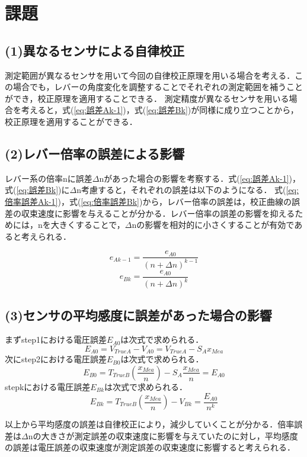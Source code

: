 \section{課題}

\subsection{(1)異なるセンサによる自律校正}
測定範囲が異なるセンサを用いて今回の自律校正原理を用いる場合を考える．この場合でも，レバーの角度変化を調整することでそれぞれの測定範囲を補うことができ，校正原理を適用することできる．
測定精度が異なるセンサを用いる場合を考えると，式(\ref{eq:誤差Ak-1})，式(\ref{eq:誤差Bk})が同様に成り立つことから，校正原理を適用することができる．

\subsection{(2)レバー倍率の誤差による影響}
レバー系の倍率nに誤差$\Delta$nがあった場合の影響を考察する．式(\ref{eq:誤差Ak-1})，式(\ref{eq:誤差Bk})に$\Delta$n考慮すると，それぞれの誤差は以下のようになる．
式(\ref{eq:倍率誤差Ak-1})，式(\ref{eq:倍率誤差Bk})から，レバー倍率の誤差は，校正曲線の誤差の収束速度に影響を与えることが分かる．レバー倍率の誤差の影響を抑えるためには，nを大きくすることで，$\Delta$nの影響を相対的に小さくすることが有効であると考えられる．

\begin{equation}
    e_{Ak-1} = \frac{e_{A0}}{(n + \Delta n)^{k-1}}
    \label{eq:倍率誤差Ak-1}
\end{equation}
\begin{equation}
    e_{Bk} = \frac{e_{A0}}{(n + \Delta n)^{k}}
    \label{eq:倍率誤差Bk}
\end{equation}

\subsection{(3)センサの平均感度に誤差があった場合の影響}
まずstep1における電圧誤差$E_{A0}$は次式で求められる．
\begin{equation}
    E_{A0} = V_{TrueA} - V_{A0} = V_{TrueA} - S_Ax_{Mea}
    \label{eq:電圧誤差A0}
\end{equation}
次にstep2における電圧誤差$E_{B0}$は次式で求められる．
\begin{equation}
    E_{B0} = T_{TrueB}(\frac{x_{Mea}}{n}) - S_A\frac{x_{Mea}}{n} = E_{A0}
    \label{eq:電圧誤差B0}
\end{equation}
stepkにおける電圧誤差$E_{Bk}$は次式で求められる．
\begin{equation}
    E_{Bk} = T_{TrueB}(\frac{x_{Mea}}{n}) - V_{Bk} = \frac{E_{A0}}{n^k}
    \label{eq:電圧誤差Bk}
\end{equation}

以上から平均感度の誤差は自律校正により，減少していくことが分かる．倍率誤差は$\Delta$nの大きさが測定誤差の収束速度に影響を与えていたのに対し，平均感度の誤差は電圧誤差の収束速度が測定誤差の収束速度に影響すると考えられる．
